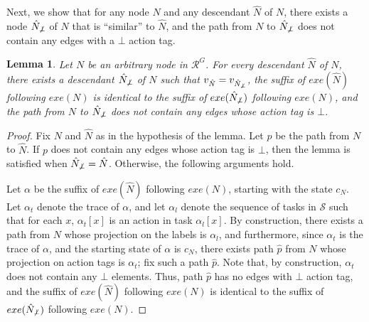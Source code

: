 \documentclass[11pt]{article}
\numberwithin{theorem}{section}
\newtheorem{lemma}[theorem]{Lemma}
\begin{document}
Next, we show that for any node $N$ and any descendant $\hat{N}$ of $N$, there exists a node $\hat{N}_{\not\bot}$ of $N$ that is ``similar'' to $\hat{N}$, and the path from $N$ to $\hat{N}_{\not\bot}$ does not contain any edges with a $\bot$ action tag.

\begin{lemma}\label{lem:everyDescendantNoBot}
 Let $N$ be an arbitrary node in $\mathcal{R}^{G}$. For every descendant $\hat{N}$ of $N$, there exists a descendant $\hat{N}_{\not\bot}$ of $N$ such that  $v_{\hat{N}} = v_{\hat{N}_{\not\bot}}$, the suffix of $exe(\hat{N})$ following $exe(N)$ is identical to the suffix of $exe(\hat{N}_{\not\bot})$ following $exe(N)$, and the path  from $N$ to $\hat{N}_{\not\bot}$ does not contain any edges whose action tag is $\bot$.
\end{lemma}
\begin{proof}
Fix $N$ and $\hat{N}$ as in the hypothesis of the lemma. Let $p$ be the path from $N$ to $\hat{N}$. If $p$ does not contain any edges whose action tag is $\bot$, then the lemma is satisfied when $\hat{N}_{\not\bot} = \hat{N}$. Otherwise, the following arguments hold.

Let $\alpha$ be the suffix of $exe(\hat{N})$ following $exe(N)$, starting with the state $c_N$. Let $\alpha_t$ denote the trace of $\alpha$, and let $\alpha_l$ denote the sequence of tasks in $\mathcal{S}$ such that for each $x$, $\alpha_t[x]$ is an action in task $\alpha_l[x]$. By construction, there exists a path from $N$ whose projection on the labels is $\alpha_l$, and furthermore, since $\alpha_t$ is the trace of $\alpha$, and the starting state of $\alpha$ is $c_N$, there exists path $\hat{p}$ from $N$ whose projection on action tags is $\alpha_t$; fix such a path $\hat{p}$. Note that, by construction, $\alpha_t$ does not contain any $\bot$ elements. Thus, path $\hat{p}$ has no edges with $\bot$ action tag, and the suffix of $exe(\hat{N})$ following $exe(N)$ is identical to the suffix of $exe(\hat{N}_{\not\bot})$ following $exe(N)$.
\end{proof}
\end{document}
